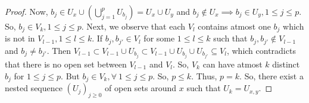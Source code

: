 \documentclass[10pt,a4paper]{amsart}
\begin{document}
\begin{proof}
	Now, $b_j\in  U_x \cup (\bigcup\limits_{j=1}^p U_{b_j})= U_x\cup U_y$ and $b_j\notin U_x \implies b_j\in U_y,  1\leq j\leq p$.
	So, $b_j\in V_k, 1\leq j\leq p.$ Next, we observe that each  $V_l$ contains atmost one $b_j$ which is not in $V_{l-1}, 1\leq l\leq k$. 
	If $b_j, b_{j'}\in V_l $ for some $1\leq l\leq k$ such that $b_j, b_{j'} \notin V_{l-1}$ and $b_j\neq b_{j'}$. Then $ V_{l-1}\subset  V_{l-1}\cup U_{b_j}\subset V_{l-1}\cup U_{b_j} \cup  U_{b_{j'}} \subseteq V_{l}$, which contradicts that there is no open set between $V_{l-1}$ and $V_l$. So, $V_k$ can have atmost $k$ distinct $b_j$ for $1\leq j\leq p$. But $b_j\in V_k,\forall~ 1\leq j\leq p.$ So, $p\leq k$.
	Thus, $p=k$. So, there exist a nested sequence $(U_j)_{j\geq 0}$ of open sets around $x$ such that $U_k=U_{x,y}$.
\end{proof}
\end{document}
